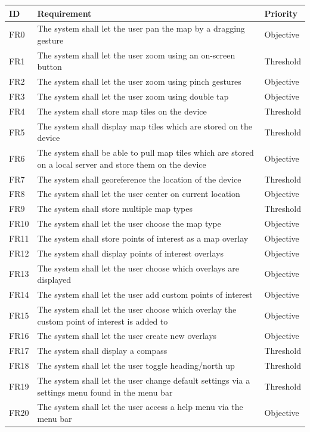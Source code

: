 \documentclass{article}
\begin{document}
\begin{tabular}{ | p{.5in} | p{4.5in} | p{1in}|}
\hline
\textbf{ID} & \textbf{Requirement} & \textbf{Priority}\\
\hline
\hline
FR0 & The system shall let the user pan the map by a dragging gesture & Objective\\
\hline
FR1 & The system shall let the user zoom using an on-screen button & Threshold\\
\hline
FR2 & The system shall let the user zoom using pinch gestures & Objective\\
\hline
FR3 & The system shall let the user zoom using double tap & Objective\\
\hline
FR4 & The system shall store map tiles on the device & Threshold\\
\hline
FR5 & The system shall display map tiles which are stored on the device & Threshold\\
\hline
FR6 & The system shall be able to pull map tiles which are stored on a local server and store them on the device & Objective\\
\hline
FR7 & The system shall georeference the location of the device & Threshold\\
\hline
FR8 & The system shall let the user center on current location & Objective\\
\hline
FR9 & The system shall store multiple map types & Threshold\\
\hline
FR10 & The system shall let the user choose the map type & Objective\\
\hline
FR11 & The system shall store points of interest as a map overlay & Objective\\
\hline
FR12 & The system shall display points of interest overlays & Objective\\
\hline
FR13 & The system shall let the user choose which overlays are displayed & Objective\\
\hline
FR14 & The system shall let the user add custom points of interest & Objective\\
\hline
FR15 & The system shall let the user choose which overlay the custom point of interest is added to & Objective\\
\hline
FR16 & The system shall let the user create new overlays & Objective\\
\hline
FR17 & The system shall display a compass & Threshold\\
\hline
FR18 & The system shall let the user toggle heading/north up & Threshold\\
\hline
FR19 & The system shall let the user change default settings via a settings menu found in the menu bar & Threshold\\
\hline
FR20 & The system shall let the user access a help menu via the menu bar & Objective\\
\hline
\end{tabular}
\end{document}
